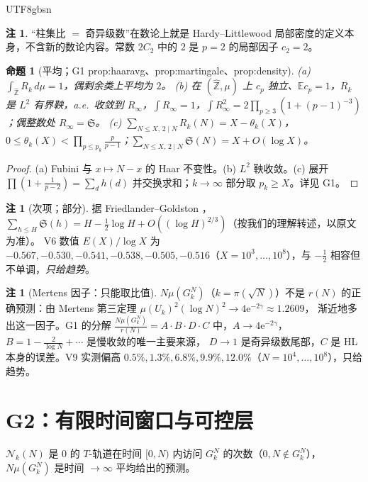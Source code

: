 \documentclass[11pt,a4paper]{article}
\newcommand{\Zhat}{\widehat{\mathbb Z}}
\newcommand{\Haar}{\mu}
\newcommand{\Sing}{\mathfrak S}
\newcommand{\status}[1]{\par\noindent\fbox{\textbf{状态：#1}}\par\smallskip}
\newcommand{\Cnt}{\mathcal N}          %
\newcommand{\ee}{\mathrm e}
\theoremstyle{plain}
\newtheorem{prop}{命题}
\theoremstyle{definition}
\newtheorem{rem}[lem]{注}
\begin{document}
\begin{CJK}{UTF8}{gbsn}
\begin{rem}
“柱集比 $=$ 奇异级数”在数论上就是 Hardy--Littlewood 局部密度的定义本身，不含新的数论内容。常数 $2C_2$ 中的 $2$ 是 $p=2$ 的局部因子 $c_2=2$。
\end{rem}

\begin{prop}[平均；G1 prop:haaravg、prop:martingale、prop:density]\label{paper:prop:avg}
(a) $\int_{\Zhat}R_k\,d\Haar=1$，偶剩余类上平均为 $2$。
(b) 在 $(\Zhat,\Haar)$ 上 $c_p$ 独立、$\mathbb E c_p=1$，$R_k$ 是 $L^2$ 有界鞅，a.e.\ 收敛到 $R_\infty$，$\int R_\infty=1$，$\int R_\infty^2=2\prod_{p\ge3}(1+(p-1)^{-3})$；偶整数处 $R_\infty=\Sing$。
(c) $\sum_{N\le X,\,2\mid N}R_k(N)=X-\theta_k(X)$，$0\le\theta_k(X)<\prod_{p\le p_k}\frac p{p-1}$；$\sum_{N\le X,\,2\mid N}\Sing(N)=X+O(\log X)$。
\end{prop}
\status{已证}
\begin{proof}
(a) Fubini 与 $x\mapsto N-x$ 的 Haar 不变性。(b) $L^2$ 鞅收敛。(c) 展开 $\prod(1+\frac1{p-2})=\sum_{d}h(d)$ 并交换求和；$k\to\infty$ 部分取 $p_k\ge X$。详见 G1。
\end{proof}

\begin{rem}[次项；部分]\label{paper:rem:FG}
据 Friedlander--Goldston \cite{FG95}，$\sum_{h\le H}\Sing(h)=H-\frac12\log H+O((\log H)^{2/3})$（按我们的理解转述，以原文为准）。
V6 数值 $E(X)/\log X$ 为 $-0.567,-0.530,-0.541,-0.538,-0.505,-0.516$（$X=10^3,\dots,10^8$），与 $-\frac12$ 相容但不单调，\emph{只给趋势}。
\end{rem}

\begin{rem}[Mertens 因子：只能取比值]\label{paper:rem:mertens}
$N\Haar(G_k^N)$（$k=\pi(\sqrt N)$）不是 $r(N)$ 的正确预测：由 Mertens 第三定理 $\Haar(U_k)^2(\log N)^2\to4\ee^{-2\gamma}\approx1.2609$，
渐近地多出这一因子。G1 的分解 $\frac{N\Haar(G_k^N)}{r(N)}=A\cdot B\cdot D\cdot C$ 中，$A\to4\ee^{-2\gamma}$，$B=1-\frac2{\log N}+\cdots$ 是慢收敛的唯一主要来源，
$D\to1$ 是奇异级数尾部，$C$ 是 HL 本身的误差。V9 实测偏高 $0.5\%,1.3\%,6.8\%,9.9\%,12.0\%$（$N=10^4,\dots,10^8$），只给趋势。
\end{rem}

\section{G2：有限时间窗口与可控层}\label{paper:sec:G2}

$\Cnt_k(N)$ 是 $0$ 的 $T$-轨道在时间 $[0,N)$ 内访问 $G_k^N$ 的次数（$0,N\notin G_k^N$），$N\Haar(G_k^N)$ 是时间 $\to\infty$ 平均给出的预测。


\end{CJK}
\end{document}

